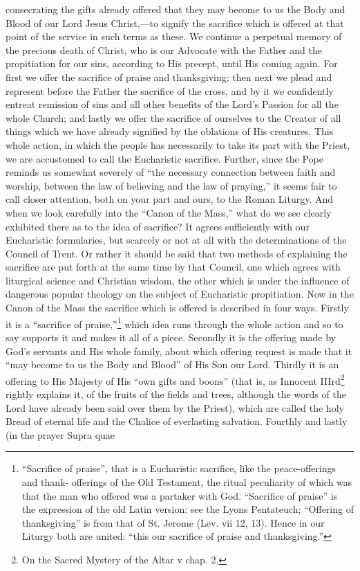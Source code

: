 consecrating the gifts already offered that they may become to us the Body and Blood of our Lord Jesus Christ,—to signify the sacrifice which is offered at that point of the service in such terms as these. We continue a perpetual memory of the precious death of Christ, who is our Advocate with the Father and the propitiation for our sins, according to His precept, until His coming again. For first we offer the sacrifice of praise and thanksgiving; then next we plead and represent before the Father the sacrifice of the cross, and by it we confidently entreat remission of sins and all other benefits of the Lord’s Passion for all the whole Church; and lastly we offer the sacrifice of ourselves to the Creator of all things which we have already signified by the oblations of His creatures. This whole action, in which the people has necessarily to take its part with the Priest, we are accustomed to call the Eucharistic sacrifice. Further, since the Pope reminds us somewhat severely of “the necessary connection between faith and worship, between the law of believing and the law of praying,” it seems fair to call closer attention, both on your part and ours, to the Roman Liturgy. And when we look carefully into the “Canon of the Mass,” what do we see clearly exhibited there as to the idea of sacrifice? It agrees sufficiently with our Eucharistic formularies, but scarcely or not at all with the determinations of the Council of Trent. Or rather it should be said that two methods of explaining the sacrifice are put forth at the same time by that Council, one which agrees with liturgical science and Christian wisdom, the other which is under the influence of dangerous popular theology on the subject of Eucharistic propitiation. Now in the Canon of the Mass the sacrifice which is offered is described in four ways. Firstly it is a “sacrifice of praise,”\footnote{“Sacrifice of praise”, that is a Eucharistic sacrifice, like the peace-offerings and thank- offerings of the Old Testament, the ritual peculiarity of which was that the man who offered was a partaker with God. “Sacrifice of praise” is the expression of the old Latin version: see the Lyons Pentateuch; “Offering of thanksgiving” is from that of St. Jerome (Lev. vii 12, 13). Hence in our Liturgy both are united: “this our sacrifice of praise and thanksgiving.”} which idea runs through the whole action and so to say supports it and makes it all of a piece. Secondly it is the offering made by God’s servants and His whole family, about which offering request is made that it “may become to us the Body and Blood” of His Son our Lord. Thirdly it is an offering to His Majesty of His “own gifts and boons” (that is, as Innocent IIIrd\footnote{On the Sacred Mystery of the Altar v chap. 2.} rightly explains it, of the fruits of the fields and trees, although the words of the Lord have already been said over them by the Priest), which are called the holy Bread of eternal life and the Chalice of everlasting salvation. Fourthly and lastly (in the prayer Supra quae

